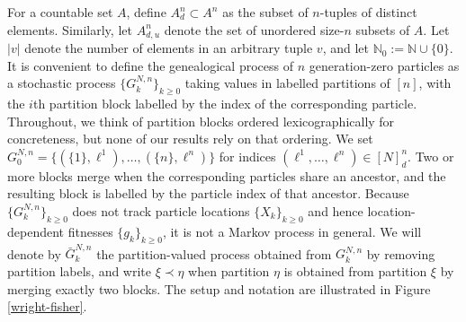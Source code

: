 \documentclass[a4paper,11pt]{article}
\theoremstyle{definition}
\newcommand{\bbN}{\mathbb{N}}
\begin{document}
For a countable set $A$, define $A_d^n \subset A^n$ as the subset of $n$-tuples of distinct elements.
Similarly, let $A_{ d, u }^n$ denote the set of unordered size-$n$ subsets of $A$.
Let $| v |$ denote the number of elements in an arbitrary tuple $v$, and let $\bbN_0 := \bbN \cup \{ 0 \}$.
It is convenient to define the genealogical process of $n$ generation-zero particles as a stochastic process $\{ G_k^{ N, n } \}_{ k \geq 0 }$ taking values in labelled partitions of $[n]$, with the $i$th partition block labelled by the index of the corresponding particle.
Throughout, we think of partition blocks ordered lexicographically for concreteness, but none of our results rely on that ordering.
We set $G_0^{ N, n } = \{ ( \{ 1 \}, \ell^1 ), \ldots, ( \{ n \}, \ell^n ) \}$ for indices $( \ell^1, \ldots, \ell^n ) \in [ N ]_d^n$.
Two or more blocks merge when the corresponding particles share an ancestor, and the resulting block is labelled by the particle index of that ancestor.
Because $\{ G_k^{ N, n } \}_{ k \geq 0 }$ does not track particle locations $\{ X_k \}_{ k \geq 0 }$ and hence location-dependent fitnesses $\{ g_k \}_{ k \geq 0 }$, it is not a Markov process in general.
We will denote by $\bar{G}_k^{ N, n }$ the partition-valued process obtained from $G_k^{ N, n }$ by removing partition labels, and write $\xi \prec \eta$ when partition $\eta$ is obtained from partition $\xi$ by merging exactly two blocks.
The setup and notation are illustrated in Figure \ref{wright-fisher}.
\end{document}
